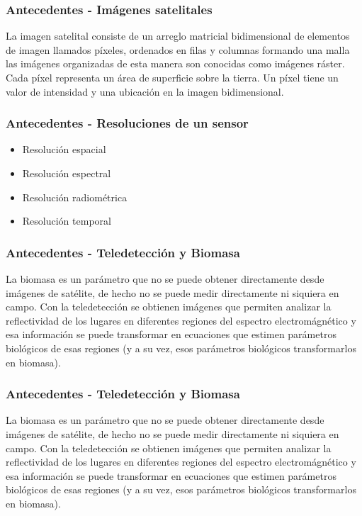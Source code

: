 \documentclass[xcolor=table]{beamer}
\begin{document}
\begin{frame}\frametitle{Antecedentes - Im\'agenes satelitales}
La imagen satelital consiste de un arreglo matricial bidimensional de elementos de imagen llamados p\'ixeles, ordenados en filas y columnas formando una malla las im\'agenes organizadas de esta manera son conocidas como im\'agenes r\'aster. Cada p\'ixel representa un \'area de superficie sobre la tierra. Un p\'ixel tiene un valor de intensidad y una ubicaci\'on en la imagen bidimensional.
	
\end{frame}
\begin{frame}\frametitle{Antecedentes - Resoluciones de un sensor}

	\begin{itemize}
		\item Resoluci\'on espacial
		\item Resoluci\'on espectral
		\item Resoluci\'on radiom\'etrica
		\item Resoluci\'on temporal
	\end{itemize}
	
	
\end{frame}

\begin{frame}\frametitle{Antecedentes - Teledetecci\'on y Biomasa }
	
La biomasa es un par\'ametro que no se puede obtener directamente desde im\'agenes de sat\'elite, de hecho no se puede medir directamente ni siquiera en campo. Con la teledetecci\'on se obtienen im\'agenes que permiten analizar la reflectividad de los lugares en diferentes regiones del espectro electrom\'agnético y esa informaci\'on se puede transformar en ecuaciones que estimen par\'ametros biol\'ogicos de esas regiones (y a su vez, esos par\'ametros biol\'ogicos transformarlos en biomasa).
	
	
\end{frame}

\begin{frame}\frametitle{Antecedentes - Teledetecci\'on y Biomasa }
	
	La biomasa es un par\'ametro que no se puede obtener directamente desde im\'agenes de sat\'elite, de hecho no se puede medir directamente ni siquiera en campo. Con la teledetecci\'on se obtienen im\'agenes que permiten analizar la reflectividad de los lugares en diferentes regiones del espectro electrom\'agnético y esa informaci\'on se puede transformar en ecuaciones que estimen par\'ametros biol\'ogicos de esas regiones (y a su vez, esos par\'ametros biol\'ogicos transformarlos en biomasa).
	
	
\end{frame}
\end{document}
